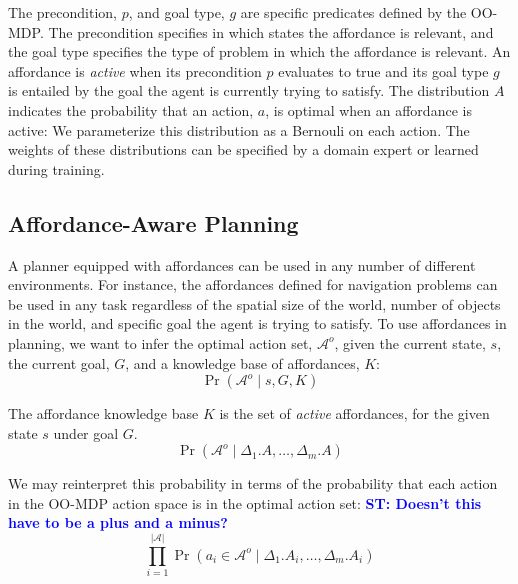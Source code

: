 \documentclass[conference]{IEEEtran}
\newcommand{\stnote}[1]{\textcolor{Blue}{\textbf{ST: #1}}}
\begin{document}
The precondition, $p$, and goal type, $g$ are specific predicates
defined by the OO-MDP. The precondition specifies in which states the
affordance is relevant, and the goal type specifies the type of
problem in which the affordance is relevant.  An affordance is {\it
  active} when its precondition $p$ evaluates to true and its goal
type $g$ is entailed by the goal the agent is currently trying to
satisfy.  The distribution $A$ indicates the probability that an
action, $a$, is optimal when an affordance is active: We parameterize
this distribution as a Bernouli on each action. The weights of these
distributions can be specified by a domain expert or learned during
training.




\subsection{Affordance-Aware Planning}

A planner equipped with affordances can be used in any number of
different environments. For instance, the affordances defined for
navigation problems can be used in any task regardless of the spatial
size of the world, number of objects in the world, and specific goal
the agent is trying to satisfy.  To use affordances in planning, we
want to infer the optimal action set, $\mathcal{A}^o$, given the current state, $s$,  the current  goal, $G$, and a knowledge base of affordances, $K$:
\begin{equation}
\Pr(\mathcal{A}^o \mid s, G, K)
\end{equation}

The affordance knowledge base $K$ is the set of {\it active}
affordances, for the given state $s$ under goal $G$.
\begin{equation}
\Pr(\mathcal{A}^o \mid \Delta_1.A, \ldots, \Delta_m.A)
\end{equation}

We may reinterpret this probability in terms of the probability that each action in the OO-MDP action space is in the optimal action set:
\stnote{Doesn't this have to be a plus and a minus?}
\begin{equation}
\prod_{i=1}^{|\mathcal{A}|}\Pr(a_i \in \mathcal{A}^o \mid \Delta_1.A_i, \ldots, \Delta_m.A_i)
\end{equation}
\end{document}

